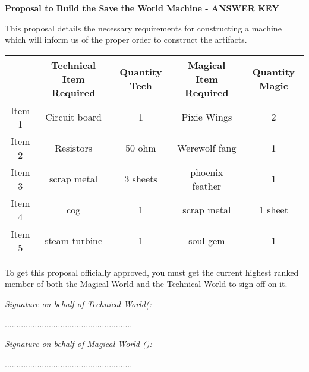 \documentclass[white]{guildcamp3}
\begin{document}
\name{\wProposalAns{}} %
\large\textbf{Proposal to Build the Save the World Machine - ANSWER KEY}  


This proposal details the necessary requirements for constructing a machine which will inform us of the proper order to construct the artifacts. 


\begin{tabular}{|c|c|c|c|c|}
	\hline \rule[-2ex]{0pt}{5.5ex}  & Technical Item Required & Quantity Tech & Magical Item Required & Quantity Magic \\ 
	\hline \rule[-2ex]{0pt}{5.5ex} Item 1 & Circuit board & 1 & Pixie Wings & 2 \\ 
	\hline \rule[-2ex]{0pt}{5.5ex} Item 2 & Resistors & 50 ohm & Werewolf fang & 1 \\ 
	\hline \rule[-2ex]{0pt}{5.5ex} Item 3 & scrap metal & 3 sheets & phoenix feather & 1 \\ 
	\hline \rule[-2ex]{0pt}{5.5ex} Item 4 & cog & 1 & scrap metal & 1 sheet \\ 
	\hline \rule[-2ex]{0pt}{5.5ex} Item 5 & steam turbine & 1 & soul gem & 1 \\ 
	\hline 
\end{tabular} 

To get this proposal officially approved, you must get the current highest ranked member of both the Magical World and the Technical World to sign off on it. 



\emph{Signature on behalf of Technical World(\cPoliOne{\intro}: }

.......................................................



\emph{Signature on behalf of Magical World (\cNobleOne{\intro}):}


.......................................................


\end{document}
